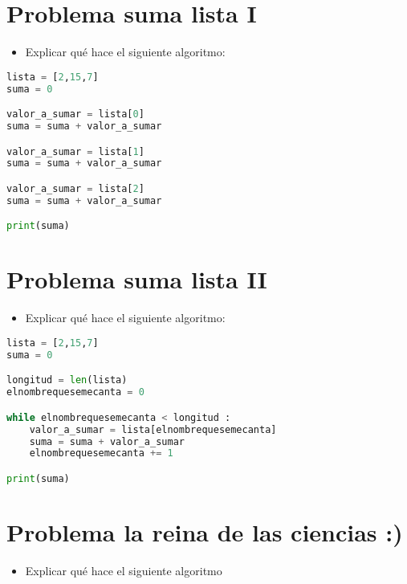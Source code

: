 \documentclass{article}
\begin{document}
\clearpage
\section{Problema suma lista I}

\begin{itemize}
    \item Explicar qué  hace el siguiente algoritmo:
\end{itemize}

\begin{lstlisting}[language=Python]
lista = [2,15,7]
suma = 0

valor_a_sumar = lista[0]
suma = suma + valor_a_sumar

valor_a_sumar = lista[1]
suma = suma + valor_a_sumar

valor_a_sumar = lista[2]
suma = suma + valor_a_sumar

print(suma)

\end{lstlisting}


\section{Problema suma lista II}

\begin{itemize}
    \item Explicar qué  hace el siguiente algoritmo:
\end{itemize}

\begin{lstlisting}[language=Python]
lista = [2,15,7]
suma = 0

longitud = len(lista)
elnombrequesemecanta = 0

while elnombrequesemecanta < longitud :
    valor_a_sumar = lista[elnombrequesemecanta]
    suma = suma + valor_a_sumar
    elnombrequesemecanta += 1 

print(suma)
\end{lstlisting}


\section{Problema la reina de las ciencias :)}

\begin{itemize}
    \item Explicar qué hace el siguiente algoritmo
    
\end{itemize}
    
\end{document}
